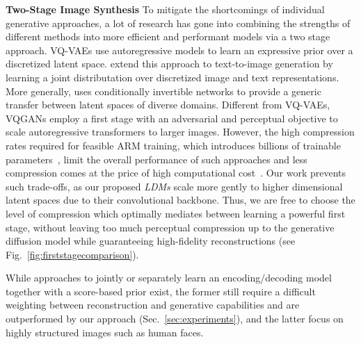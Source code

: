 \documentclass[10pt,twocolumn,letterpaper]{article}
\begin{document}
\textbf{Two-Stage Image Synthesis}
\enlargethispage{\baselineskip}
To mitigate the shortcomings of individual generative approaches, a lot of research \cite{DBLP:conf/iclr/DaiW19,  DBLP:conf/nips/RombachEO20, DBLP:journals/corr/abs-2012-09841, yu2021vectorquantized, DBLP:journals/corr/abs-2104-10157, DBLP:conf/nips/RazaviOV19} has gone into combining the strengths of different methods into more efficient and performant models via a two stage approach. VQ-VAEs \cite{DBLP:journals/corr/abs-2104-10157, DBLP:conf/nips/RazaviOV19} use autoregressive models to learn an expressive prior over a discretized latent space.
\cite{DBLP:journals/corr/abs-2102-12092} extend this approach to text-to-image generation by learning a joint distributation over discretized image and text representations.
More generally, \cite{DBLP:conf/nips/RombachEO20} uses conditionally invertible networks to provide a generic transfer between latent spaces of diverse domains.
Different from VQ-VAEs, VQGANs \cite{DBLP:journals/corr/abs-2012-09841, yu2021vectorquantized} employ a first stage with an adversarial and perceptual objective to scale autoregressive transformers to larger images.
%
However, the high compression rates required for feasible ARM training, which introduces billions of trainable parameters~\cite{DBLP:journals/corr/abs-2102-12092,DBLP:journals/corr/abs-2012-09841}, limit the overall performance of such approaches and less compression comes at the price of high computational cost~\cite{DBLP:journals/corr/abs-2102-12092,DBLP:journals/corr/abs-2012-09841}.
Our work prevents such trade-offs, as our proposed \emph{LDMs} scale more gently to higher dimensional latent spaces due to their convolutional backbone. %
Thus, we are free to choose the level of compression which optimally mediates between learning a powerful first stage, without leaving too much perceptual compression up to the generative diffusion model while guaranteeing high-fidelity reconstructions (see Fig.~\ref{fig:firststagecomparison}).

While approaches to jointly \cite{DBLP:journals/corr/abs-2106-05931} or separately \cite{DBLP:journals/corr/abs-2106-06819} 
learn an encoding/decoding model together with a score-based prior exist,
the former still require a difficult weighting between reconstruction and generative capabilities \cite{DBLP:conf/iclr/DaiW19} and are outperformed by our approach (Sec.~\ref{sec:experiments}), and the latter focus on highly structured images such as human faces.

%
%
%
%
%
%
%
%
%
%
%
\end{document}
